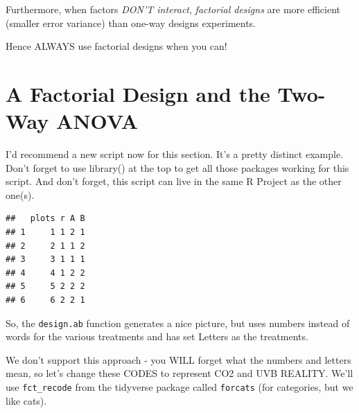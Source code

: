 \documentclass[
]{book}
\newenvironment{Shaded}{\begin{snugshade}}{\end{snugshade}}
\newcommand{\AttributeTok}[1]{\textcolor[rgb]{0.77,0.63,0.00}{#1}}
\newcommand{\CommentTok}[1]{\textcolor[rgb]{0.56,0.35,0.01}{\textit{#1}}}
\newcommand{\DecValTok}[1]{\textcolor[rgb]{0.00,0.00,0.81}{#1}}
\newcommand{\FunctionTok}[1]{\textcolor[rgb]{0.00,0.00,0.00}{#1}}
\newcommand{\NormalTok}[1]{#1}
\newcommand{\OtherTok}[1]{\textcolor[rgb]{0.56,0.35,0.01}{#1}}
\newcommand{\SpecialCharTok}[1]{\textcolor[rgb]{0.00,0.00,0.00}{#1}}
\newcommand{\StringTok}[1]{\textcolor[rgb]{0.31,0.60,0.02}{#1}}
\begin{document}
Furthermore, when factors \emph{DON'T interact}, \emph{factorial designs} are more efficient (smaller error variance) than one-way designs experiments.

Hence ALWAYS use factorial designs when you can!

\hypertarget{a-factorial-design-and-the-two-way-anova}{%
\section{A Factorial Design and the Two-Way ANOVA}\label{a-factorial-design-and-the-two-way-anova}}

I'd recommend a new script now for this section. It's a pretty distinct example. Don't forget to use library() at the top to get all those packages working for this script. And don't forget, this script can live in the same R Project as the other one(s).

\begin{Shaded}
\end{Shaded}

\begin{verbatim}
##   plots r A B
## 1     1 1 2 1
## 2     2 1 1 2
## 3     3 1 1 1
## 4     4 1 2 2
## 5     5 2 2 2
## 6     6 2 2 1
\end{verbatim}

So, the \texttt{design.ab} function generates a nice picture, but uses numbers instead of words for the various treatments and has set Letters as the treatments.

We don't support this approach - you WILL forget what the numbers and letters mean, so let's change these CODES to represent CO2 and UVB REALITY. We'll use \texttt{fct\_recode} from the tidyverse package called \texttt{forcats} (for categories, but we like cats).
\end{document}
